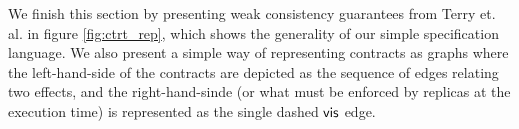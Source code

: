 We finish this section by presenting weak consistency guarantees from
Terry et. al. in figure \ref{fig:ctrt_rep}, which shows the generality
of our simple specification language. We also present a simple way of
representing contracts as graphs where the left-hand-side of the
contracts are depicted as the sequence of edges relating two effects,
and the right-hand-sinde (or what must be enforced by replicas at the
execution time) is represented as the single dashed ${\normalfont \textsf{vis}}$ edge.

